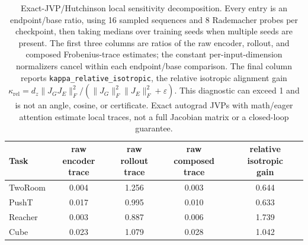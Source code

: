 \begin{table}[H]
\centering
\caption{Exact-JVP/Hutchinson local sensitivity decomposition. Every entry is an endpoint/base ratio, using 16 sampled sequences and 8 Rademacher probes per checkpoint, then taking medians over training seeds when multiple seeds are present. The first three columns are ratios of the raw encoder, rollout, and composed Frobenius-trace estimates; the constant per-input-dimension normalizers cancel within each endpoint/base comparison. The final column reports \texttt{kappa\_relative\_isotropic}, the relative isotropic alignment gain $\kappa_{\mathrm{rel}}=d_z\lVert J_GJ_E\rVert_F^2/(\lVert J_G\rVert_F^2\lVert J_E\rVert_F^2+\varepsilon)$. This diagnostic can exceed 1 and is not an angle, cosine, or certificate. Exact autograd JVPs with math/eager attention estimate local traces, not a full Jacobian matrix or a closed-loop guarantee.}
\label{tab:jvp-hutchinson-sensitivity-audit}
\small
\setlength{\tabcolsep}{3.5pt}
\begin{tabular}{lcccc}
\toprule
Task & \shortstack{raw encoder\\trace} & \shortstack{raw rollout\\trace} & \shortstack{raw composed\\trace} & \shortstack{relative isotropic\\gain} \\
\midrule
TwoRoom & 0.004 & 1.256 & 0.003 & 0.644 \\
PushT & 0.017 & 0.995 & 0.010 & 0.633 \\
Reacher & 0.003 & 0.887 & 0.006 & 1.739 \\
Cube & 0.023 & 1.079 & 0.028 & 1.042 \\
\bottomrule
\end{tabular}
\end{table}
